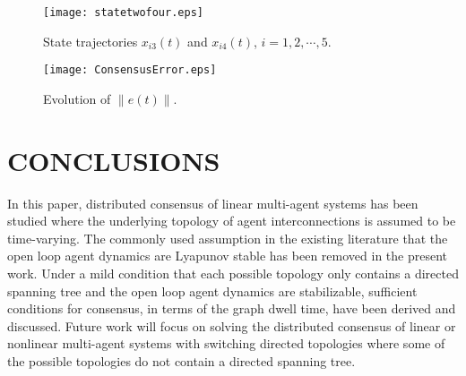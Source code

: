 \documentclass[letterpaper, 10 pt, conference]{ieeeconf}
\begin{document}
\begin{figure}[!t]
\centering
\texttt{[image: statetwofour.eps]}
 \caption{State trajectories $x_{i3}(t)$ and $x_{i4}(t)$, $i=1,2,\cdots,5$. }
\label{FigureStateTwo}
\end{figure}


\begin{figure}[!t]
\centering
\texttt{[image: ConsensusError.eps]}
 \caption{Evolution of $\|e(t)\|$. }
\label{FigureConsensusError}
\end{figure}




\section{CONCLUSIONS}
In this paper, distributed consensus of linear
multi-agent systems has been studied where the underlying topology of agent
interconnections is assumed to be time-varying. The commonly used assumption
in the existing literature that the open loop agent dynamics
are Lyapunov stable has been removed in the present work. Under a mild
condition that each possible topology only contains a directed spanning
tree and the open loop agent dynamics are stabilizable, sufficient
conditions for consensus, in terms of the graph dwell time, have been
derived and discussed. Future work will
focus on solving the distributed consensus of linear or nonlinear
multi-agent systems with switching directed topologies where some of the
possible topologies do not contain a directed spanning tree.



\addtolength{\textheight}{-12cm}   
\end{document}

